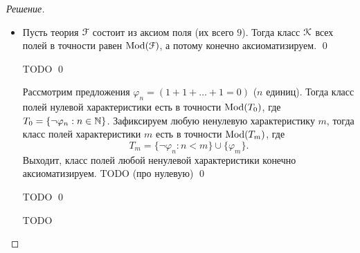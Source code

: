 \begin{proof}[Решение]
\begin{itemize}
            Пусть \(\cK_\lnot\) --- класс всех групп без кручения. Рассмотрим предложения \(\varphi_n = \forall x \ x \neq e \to x^n \neq e\) и теорию \(T = \cG \cup \{\varphi_n : n \in \bN\}\). Тогда \(\cK_\lnot = \modclass(T)\), то есть аксиоматизируем. Покажем, что при этом он не конечно аксиоматизируем.

            TODO \qed

            \item Пусть теория \(\mathcal{F}\) состоит из аксиом поля (их всего \(9\)). Тогда класс \(\mathcal{K}\) всех полей в точности равен \(\operatorname{Mod}(\mathcal{F})\), а потому конечно аксиоматизируем. \qed
            
            TODO \qed

            Рассмотрим предложения \(\varphi_n = (1 + 1 + \ldots + 1 = 0)\) (\(n\) единиц). Тогда класс полей нулевой характеристики есть в точности \(\operatorname{Mod}(T_0)\), где \(T_0 = \{\lnot \varphi_n : n \in \mathbb{N}\}\). Зафиксируем любую ненулевую характеристику \(m\), тогда класс полей характеристики \(m\) есть в точности \(\operatorname{Mod}(T_m)\), где \[
                T_m = \{\lnot \varphi_n : n < m\} \cup \{\varphi_m\}.
            \] 
            Выходит, класс полей любой ненулевой характеристики конечно аксиоматизируем. TODO (про нулевую) \qed

            TODO \qed

            TODO
        \end{itemize}
    \end{proof}

